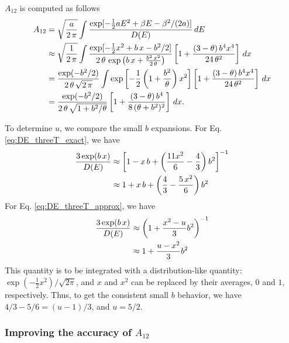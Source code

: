 \documentclass[aip,jcp,preprint,notitlepage, superscriptaddress]{revtex4-1}
\begin{document}
$A_{12}$ is computed as follows
%
\begin{align}
  A_{12}
&=
\sqrt{ \frac a {2 \, \pi} }
\int
  \frac{ \exp[-\frac 1 2 a E^2 + \beta E - \beta^2/(2a) ] }
  { D(E) } \, dE
\notag \\
&\approx
\sqrt{ \frac 1 {2 \, \pi} }
\int
  \frac{ \exp[-\frac 1 2 x^2 + b \, x - b^2 / 2 ] }
  { 2 \, \theta \,
    \exp\left(
      b \, x
      +
      \frac{ b^2 \, x^2 }
      { 2 \, \theta }
    \right)
  }
  \left[
    1
    +
    \frac{ (3 - \theta) \, b^4 x^4 }
    { 24 \, \theta^2 }
  \right]
 \, d x
\notag \\
&=
\frac { \exp(-b^2/2) }
{ 2 \, \theta \, \sqrt{2 \, \pi} }
\int
  \exp\left[
    -\frac 1 2
    \left(
      1 + \frac{ b^2 } { \theta }
    \right)
    x^2
  \right]
  \left[
    1
    +
    \frac{ (3 - \theta) \, b^4 x^4 }
    { 24 \, \theta^2 }
  \right]
 \, d x
\notag \\
&=
\frac { \exp(-b^2/2) }
{ 2 \, \theta \, \sqrt{1 + b^2/\theta} }
  \left[
    1
    +
    \frac{ (3 - \theta) \, b^4 }
    { 8 \, (\theta + b^2)^2}
  \right]
 \, d x.
\end{align}



To determine $u$,
we compare the small $b$ expansions.
%
For Eq. \eqref{eq:DE_threeT_exact},
we have
%
\begin{align*}
\frac{ 3 \exp(b \, x) }
{ D(E) }
&\approx
\left[
  1 -
  x \, b
  +
  \left(
    \frac{ 11 x^2 } 6
    - \frac 4 3
  \right)
  b^2
\right]^{-1}
\notag \\
&\approx
  1 +
  x \, b
  +
  \left(
    \frac 4 3
    - \frac{ 5 \, x^2 } 6
  \right)
  b^2
\end{align*}
%
For Eq. \eqref{eq:DE_threeT_approx},
we have
%
\begin{align*}
\frac{ 3 \exp(b \, x) }
{ D(E) }
&\approx
\left(
  1 +
  \frac{ x^2 - u } { 3 }
  b^2
\right)^{-1}
\notag \\
&\approx
  1 +
  \frac{ u - x^2 } { 3 }
  b^2
\end{align*}
%
This quantity is to be integrated with
a distribution-like quantity:
$\exp(-\frac1 2 x^2)/\sqrt{2 \pi}$,
and $x$ and $x^2$ can be replaced by their
averages, $0$ and $1$, respectively.
%
Thus,
to get the consistent small $b$ behavior,
we have
$4/3 - 5/6 = (u - 1)/3$,
and $u = 5/2$.




\subsubsection{Improving the accuracy of $A_{12}$}
\end{document}
